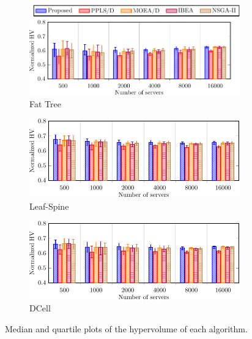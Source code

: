 \begin{figure}[t]
    \centering
    \begin{subfigure}[b]{.9\linewidth}
        \includegraphics[width=\textwidth]{figures/graphs/algorithms/fat_tree_hv-crop}
        \caption{Fat Tree}
    \end{subfigure}\vspace{.5em}
    \begin{subfigure}[b]{.9\linewidth}
        \includegraphics[width=\textwidth]{figures/graphs/algorithms/leaf_spine_hv-crop}
        \caption{Leaf-Spine}
    \end{subfigure}\vspace{.5em}
    \begin{subfigure}[b]{.9\linewidth}
        \includegraphics[width=\textwidth]{figures/graphs/algorithms/DCell_hv-crop}
        \caption{DCell}
    \end{subfigure}

    \caption{Median and quartile plots of the hypervolume of each algorithm.}
    \label{fig:alg_hv}
\end{figure}

